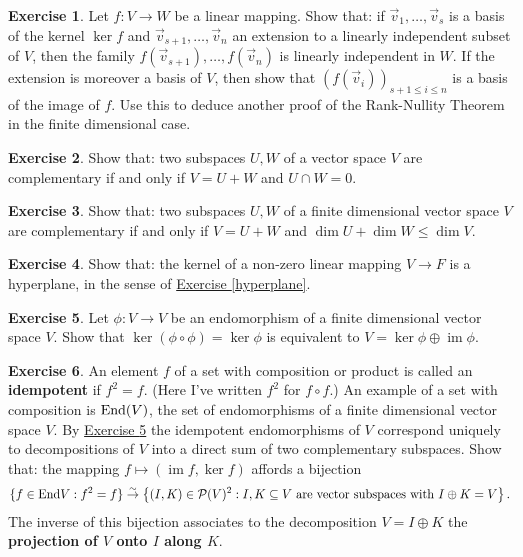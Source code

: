 \documentclass[11pt]{amsbook}
\DeclareMathOperator{\im}{\mathrm{im}}
\theoremstyle{definition}
\newtheorem{exercise}{Exercise}
\begin{document}
\begin{exercise} Let $f: V\to W$ be a linear mapping. Show that: if $ \vec{v}_1, \ldots , \vec{v}_s$ is a basis of the kernel $\ker f$ and $\vec{v}_{s+1}, \ldots , \vec{v}_n$ an extension to a linearly independent subset of $V$, then the family $f(\vec{v}_{s+1}), \ldots , f(\vec{v}_n)$ is linearly independent in $W$. If the extension is moreover a basis of $V$, then show that $(f(\vec{v}_i))_{s+1\leqslant i \leqslant n}$ is a basis of the image of $f$. Use this to deduce another proof of the Rank-Nullity Theorem in the finite dimensional case.
\end{exercise}

\begin{exercise} \label{compex} Show that: two subspaces $U,W$ of a  vector space $V$ are complementary if and only if $V = U+W$ and $U\cap W =0$.
\end{exercise}

\begin{exercise} Show that: two subspaces $U,W$ of a finite dimensional vector space $V$ are complementary if and only if $V = U+W$ and $\dim U + \dim W \leqslant \dim V$.
\end{exercise}

\begin{exercise} Show that: the kernel of a non-zero linear mapping $V\to F$ is a hyperplane, in the sense of \hyperref[hyperplane]{Exercise \ref{hyperplane}}.
\end{exercise}

\begin{exercise} \label{split} Let $\phi: V\to V$ be an endomorphism of a finite dimensional vector space $V$. Show that $\ker (\phi\circ \phi) = \ker \phi$ is equivalent to $V = \ker \phi \oplus \im \phi.$
\end{exercise}

\begin{exercise}\label{projalong} An element $f$ of a set with composition or product is called an {\bf idempotent} if $f^2 = f$. (Here I've written $f^2$ for $f\circ f$.) An example of a set with composition is ${\rm End}(V)$, the set of endomorphisms of a finite dimensional vector space $V$. By \hyperref[split]{Exercise \ref{split}} the idempotent endomorphisms of $V$ correspond uniquely to decompositions of $V$ into a direct sum of two complementary subspaces. Show that: the mapping $f\mapsto (\im f, \ker f)$ affords a bijection $$\{ f\in {\rm End} V: f^2 = f\} \stackrel{\sim}{\to} \left\{ (I,K) \in \mathcal{P}(V)^2 : I,K\subseteq V \text{ are vector subspaces with }I\oplus K = V\right\}.$$
The inverse of this bijection associates to the decomposition $V = I\oplus K$ the {\bf projection of $V$ onto $I$ along $K$}.
\end{exercise}
\end{document}
